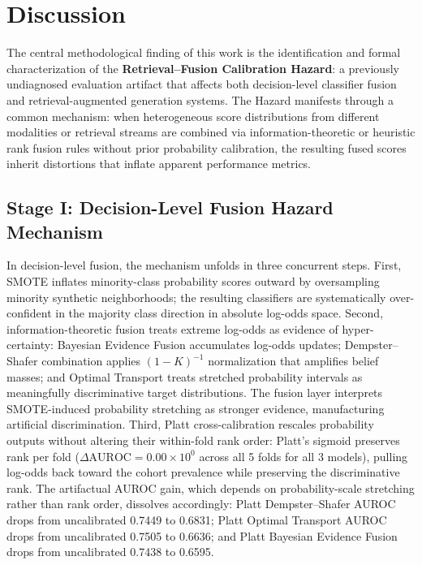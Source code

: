 \section{Discussion}
\label{sec:discussion}

The central methodological finding of this work is the identification and formal characterization of the \textbf{Retrieval--Fusion Calibration Hazard}: a previously undiagnosed evaluation artifact that affects both decision-level classifier fusion and retrieval-augmented generation systems. The Hazard manifests through a common mechanism: when heterogeneous score distributions from different modalities or retrieval streams are combined via information-theoretic or heuristic rank fusion rules without prior probability calibration, the resulting fused scores inherit distortions that inflate apparent performance metrics.

\subsection{Stage I: Decision-Level Fusion Hazard Mechanism}

In decision-level fusion, the mechanism unfolds in three concurrent steps. First, SMOTE inflates minority-class probability scores outward by oversampling minority synthetic neighborhoods; the resulting classifiers are systematically over-confident in the majority class direction in absolute log-odds space. Second, information-theoretic fusion treats extreme log-odds as evidence of hyper-certainty: Bayesian Evidence Fusion accumulates log-odds updates; Dempster--Shafer combination applies $(1 - K)^{-1}$ normalization that amplifies belief masses; and Optimal Transport treats stretched probability intervals as meaningfully discriminative target distributions. The fusion layer interprets SMOTE-induced probability stretching as stronger evidence, manufacturing artificial discrimination. Third, Platt cross-calibration rescales probability outputs without altering their within-fold rank order: Platt's sigmoid preserves rank per fold ($\Delta \text{AUROC} = 0.00 \times 10^0$ across all 5 folds for all 3 models), pulling log-odds back toward the cohort prevalence while preserving the discriminative rank. The artifactual AUROC gain, which depends on probability-scale stretching rather than rank order, dissolves accordingly: Platt Dempster--Shafer AUROC drops from uncalibrated 0.7449 to 0.6831; Platt Optimal Transport AUROC drops from uncalibrated 0.7505 to 0.6636; and Platt Bayesian Evidence Fusion drops from uncalibrated 0.7438 to 0.6595.

